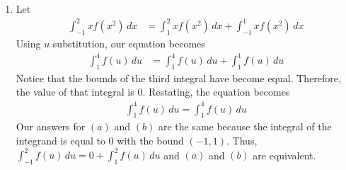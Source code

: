 \documentclass{article}
\begin{document}
\begin{enumerate}[label=\textbf{(3.\arabic*)}]
\begin{enumerate}[label=(\alph*)]
\item Let 
\begin{align*}
\int_{-1}^2\! xf\left(x^2\right) \, dx &= \int_1^2\! xf\left(x^2\right) \, dx +  \int_{-1}^1\! xf\left(x^2\right) \, dx
\end{align*}
Using $u$ substitution, our equation becomes
\begin{align*}
 \int_1^4\! f\left(u\right) \, du &=  \int_1^4\! f\left(u\right) \, du +  \int_1^1\! f\left(u\right) \, du
\end{align*}
Notice that the bounds of the third integral have become equal. Therefore, the value of that integral is 0. Restating, the equation becomes
\begin{align*}
 \int_1^4\! f\left(u\right) \, du =  \int_1^4\! f\left(u\right) \, du
\end{align*}
Our answers for $(a)$ and $(b)$ are the same because the integral of the integrand is equal to 0 with the bound $(-1,1)$. Thus, $\int_{-1}^2\!f(u)\,du=0+\int_1^2\!f(u)\,du$ and $(a)$ and $(b)$ are equivalent.
\end{enumerate}

\end{enumerate}
\end{document}
